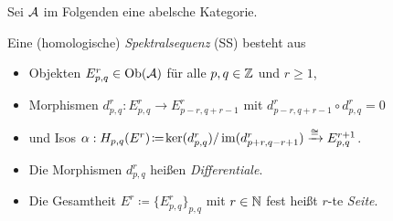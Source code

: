 \documentclass{cheat-sheet}
\begin{document}

Sei $\mathcal{A}$ im Folgenden eine abelsche Kategorie.

\begin{defn}
  Eine (homologische) \emph{Spektralsequenz} (SS) besteht aus
  \begin{itemize}
    \item Objekten $E^r_{p,q} \in \operatorname{Ob}(\mathcal{A})$ für alle $p, q \in \mathbb{Z}$ und $r \geq 1$,
    \item Morphismen $d^r_{p,q} : E^r_{p,q} \to E^r_{p-r,q+r-1}$ mit $d^r_{p-r,q+r-1} \circ d^r_{p,q} = 0$
    \item und Isos $\alpha : H_{p,q}(E^r) \!\coloneqq\! \ker(d^r_{p,q}) / \operatorname{im}(d^r_{p+r,q-r+1}) \xrightarrow{\cong} E^{r+1}_{p,q}$.
  \end{itemize}
\end{defn}


\begin{sprech}
  \begin{itemize}
    \item Die Morphismen $d^r_{p,q}$ heißen \emph{Differentiale}.
    \item Die Gesamtheit $E^r \coloneqq \{ E^r_{p,q} \}_{p,q}$ mit $r \in \mathbb{N}$ fest heißt $r$-te \emph{Seite}.
  \end{itemize}
\end{sprech}
\end{document}

